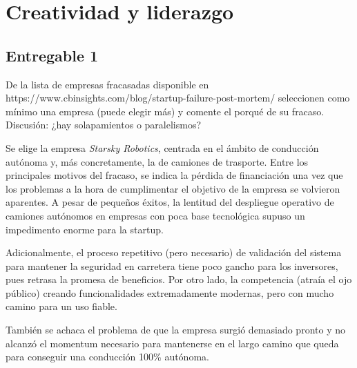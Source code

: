 \section{Creatividad y liderazgo}


\subsection{Entregable 1}
De la lista de empresas fracasadas disponible en https://www.cbinsights.com/blog/startup-failure-post-mortem/ seleccionen como mínimo una empresa (puede elegir más) y comente el porqué de su fracaso. Discusión: ¿hay solapamientos o paralelismos?

Se elige la empresa \textit{Starsky Robotics}, centrada en el ámbito de conducción autónoma y, más concretamente, la de camiones de trasporte. Entre los principales motivos del fracaso, se indica la pérdida de financiación una vez que los problemas a la hora de cumplimentar el objetivo de la empresa se volvieron aparentes. A pesar de pequeños éxitos, la lentitud del despliegue operativo de camiones autónomos en empresas con poca base tecnológica supuso un impedimento enorme para la startup.

Adicionalmente, el proceso repetitivo (pero necesario) de validación del sistema para mantener la seguridad en carretera tiene poco gancho para los inversores, pues retrasa la promesa de beneficios. Por otro lado, la competencia (atraía el ojo público) creando funcionalidades extremadamente modernas, pero con mucho camino para un uso fiable.

También se achaca el problema de que la empresa surgió demasiado pronto y no alcanzó el momentum necesario para mantenerse en el largo camino que queda para conseguir una conducción 100\% autónoma.




